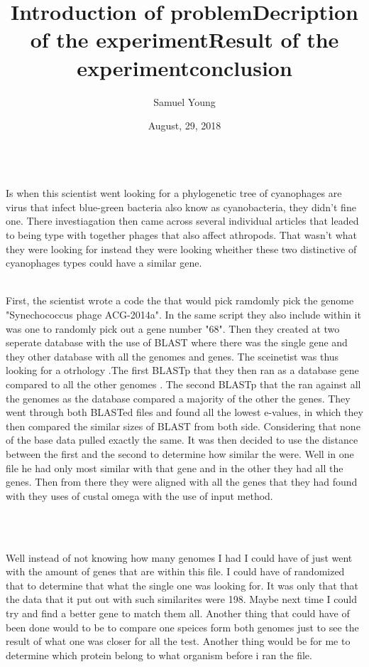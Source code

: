 \documentclass{article}
\title{}
\author{Samuel Young}
\date{August, 29, 2018}
\begin{document}
 
 \maketitle

\title{Introduction of problem}\\
  Is when this scientist went looking for a phylogenetic tree of cyanophages are virus that infect blue-green bacteria also know as cyanobacteria, they didn't fine one. There investiagation then came across several individual articles that leaded to being type with together phages that also affect athropods. That wasn't what they were looking for instead they were looking wheither these two distinctive of cyanophages  types could have a similar gene. \\
     
\title{Decription of the experiment}\\
  First, the scientist wrote a code the that would pick ramdomly pick the genome "Synechococcus phage ACG-2014a". In the same script they also include within it was one to randomly pick out a gene number "68". Then they created at two seperate database with the use of BLAST where there was the single gene and they other database with all the genomes and genes. The sceinetist was thus looking for a otrhology .The first BLASTp that they then ran  as a database gene compared to all the other genomes . The second BLASTp that the ran against all the genomes as the database compared a majority of the other the genes. They went through both BLASTed files and found all the lowest e-values, in which they then compared the similar sizes of BLAST from both side. Considering that none of the base data pulled exactly the same. It was then decided to use the distance between the first and the second to determine how similar the were. Well in one file he had only most similar with that gene and in the other they had all the genes. Then from there they were aligned with all the genes that they had found with they uses of custal omega with the use of input method.\\
\title{Result of the experiment}\\
   \begin{texshade}
    \showlegend
    \end{texshade}

\title{conclusion}\\
  Well instead of not knowing how many genomes I had I could have of just went with the amount of genes that are within this file. I could have of randomized that to determine that what the single one was looking for. It was only that that the  data that it put out with such similarites were 198.  Maybe next time I could try and find a better gene to match them all. Another thing that could  have of been done would to be to compare one speices form both genomes just to see the result of what one was closer for all the test. Another thing would be for me to determine which protein belong to what organism before i ran the file.\\
\end{document}
